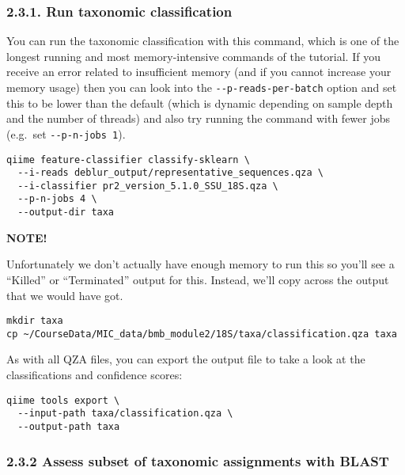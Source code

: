 \documentclass[
]{book}
\newenvironment{redbox}{
  \definecolor{shadecolor}{RGB}{243, 154, 157}
  \color{white}
  \begin{shaded}}
 {\end{shaded}}
\begin{document}
\subsubsection{2.3.1. Run taxonomic classification}\label{run-taxonomic-classification-1}

You can run the taxonomic classification with this command, which is one of the longest running and most memory-intensive commands of the tutorial. If you receive an error related to insufficient memory (and if you cannot increase your memory usage) then you can look into the \texttt{-\/-p-reads-per-batch} option and set this to be lower than the default (which is dynamic depending on sample depth and the number of threads) and also try running the command with fewer jobs (e.g.~set \texttt{-\/-p-n-jobs\ 1}).

\begin{verbatim}
qiime feature-classifier classify-sklearn \
  --i-reads deblur_output/representative_sequences.qza \
  --i-classifier pr2_version_5.1.0_SSU_18S.qza \
  --p-n-jobs 4 \
  --output-dir taxa
\end{verbatim}

\begin{redbox}

\begin{center}
\textbf{NOTE!}

\end{center}

Unfortunately we don't actually have enough memory to run this so you'll see a ``Killed'' or ``Terminated'' output for this.
Instead, we'll copy across the output that we would have got.

\end{redbox}

\begin{verbatim}
mkdir taxa      
cp ~/CourseData/MIC_data/bmb_module2/18S/taxa/classification.qza taxa
\end{verbatim}

As with all QZA files, you can export the output file to take a look at the classifications and confidence scores:

\begin{verbatim}
qiime tools export \
  --input-path taxa/classification.qza \
  --output-path taxa
\end{verbatim}

\subsubsection{2.3.2 Assess subset of taxonomic assignments with BLAST}\label{assess-subset-of-taxonomic-assignments-with-blast-1}
\end{document}
